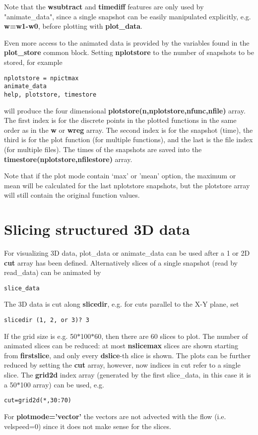 \documentclass{article}
\begin{document}
Note that the {\bf wsubtract} and {\bf timediff} features are only 
used by "animate\_data", since a single snapshot can be easily 
manipulated explicitly, e.g. {\bf w=w1-w0}, before plotting with
{\bf plot\_data}. 

Even more access to the animated data is provided by the variables found in the
{\bf plot\_store} common block. Setting {\bf nplotstore}
to the number of snapshots to be stored, for example
\begin{verbatim}
nplotstore = npictmax
animate_data
help, plotstore, timestore
\end{verbatim}
will produce the four dimensional {\bf plotstore(n,nplotstore,nfunc,nfile)} array.
The first index is for the discrete points in the plotted functions in the
same order as in the {\bf w} or {\bf wreg} array.
The second index is for the snapshot (time), the third is for the
plot function (for multiple functions), and the last is the file index 
(for multiple files).
The times of the snapshots are saved into the {\bf timestore(nplotstore,nfilestore)}
array. 

Note that if the plot mode contain `max' or 'mean' option, the 
maximum or mean will be calculated for the last nplotstore snapshots,
but the plotstore array will still contain the original function values.

\section{Slicing structured 3D data \label{s-slice}}

For visualizing 3D data, plot\_data or animate\_data can be used after a
1 or 2D {\bf cut} array has been defined. Alternatively slices of a single
snapshot (read by read\_data) can be animated by
\begin{verbatim}
slice_data
\end{verbatim}
The 3D data is cut along {\bf slicedir}, e.g. for cuts parallel to the
X-Y plane, set
\begin{verbatim}
slicedir (1, 2, or 3)? 3
\end{verbatim}
If the grid size is e.g. 50$*$100$*$60, then there are 60 slices to plot.
The number of animated slices can be reduced:
at most {\bf nslicemax} slices are shown starting from {\bf firstslice},
and only every {\bf dslice}-th slice is shown.
The plots can be further reduced by setting the {\bf cut} array,
however, now indices in cut refer to a single slice. The {\bf grid2d} 
index array (generated by the first slice\_data, in this case it is a 50$*$100 
array) can be used, e.g.
\begin{verbatim}
cut=grid2d(*,30:70)
\end{verbatim}
For {\bf plotmode='vector'} the vectors are not advected with the flow 
(i.e. velspeed=0) since it does not make sense for the slices.
\end{document}
